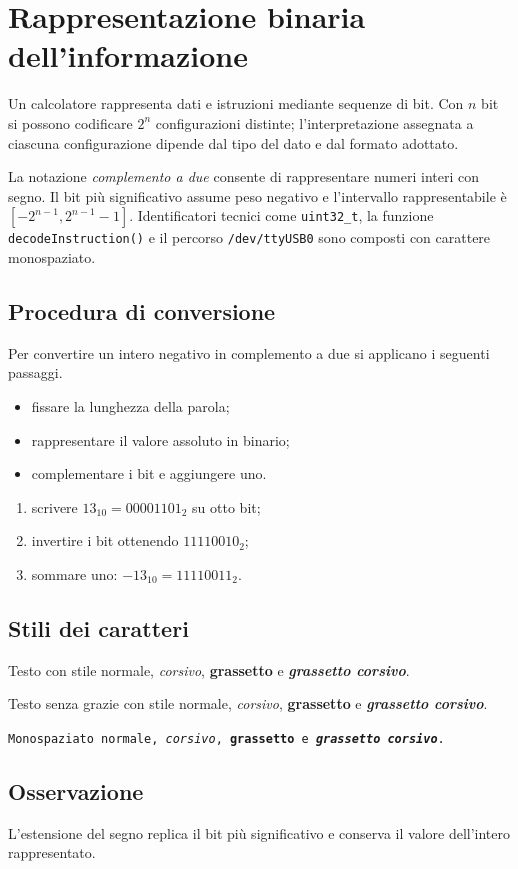 \documentclass{../../../unipd-notes}
\begin{document}
\chapter*{Rappresentazione binaria dell'informazione}

Un calcolatore rappresenta dati e istruzioni mediante sequenze di bit. Con $n$ bit si possono codificare $2^n$ configurazioni distinte; l'interpretazione assegnata a ciascuna configurazione dipende dal tipo del dato e dal formato adottato.

La notazione \emph{complemento a due} consente di rappresentare numeri interi con segno. Il bit più significativo assume peso negativo e l'intervallo rappresentabile è \textbf{$[-2^{n-1},2^{n-1}-1]$}. Identificatori tecnici come \texttt{uint32\_t}, la funzione \texttt{decodeInstruction()} e il percorso \texttt{/dev/ttyUSB0} sono composti con carattere monospaziato.

\section*{Procedura di conversione}
Per convertire un intero negativo in complemento a due si applicano i seguenti passaggi.

\begin{itemize}
  \item fissare la lunghezza della parola;
  \item rappresentare il valore assoluto in binario;
  \item complementare i bit e aggiungere uno.
\end{itemize}

\begin{enumerate}
  \item scrivere $13_{10}=00001101_2$ su otto bit;
  \item invertire i bit ottenendo $11110010_2$;
  \item sommare uno: $-13_{10}=11110011_2$.
\end{enumerate}

\section*{Stili dei caratteri}
Testo con stile normale, \textit{corsivo}, \textbf{grassetto} e
\textbf{\textit{grassetto corsivo}}.

{\sffamily Testo senza grazie con stile normale, \textit{corsivo},
\textbf{grassetto} e \textbf{\textit{grassetto corsivo}}.\par}

\texttt{Monospaziato normale, \textit{corsivo}, \textbf{grassetto} e
\textbf{\textit{grassetto corsivo}}.}

\section*{Osservazione}
\begin{displayquote}
L'estensione del segno replica il bit più significativo e conserva il valore dell'intero rappresentato.
\end{displayquote}
\end{document}
